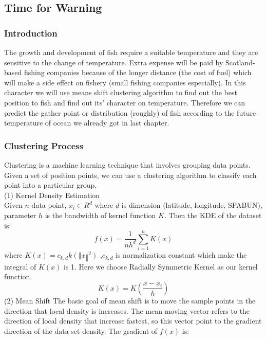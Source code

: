 \documentclass{mcmthesis}
\begin{document}
\subsection{Time for Warning}
\subsubsection{Introduction}
The growth and development of fish require a suitable temperature and they are sensitive to the change of temperature. Extra expense will be paid by Scotland-based fishing companies because of the longer distance (the cost of fuel) which will make a side effect on fishery (small fishing companies especially).  In this character we will use means shift clustering algorithm to find out the best position to fish and find out its’ character on temperature. Therefore we can predict the gather point or distribution (roughly) of fish according to the future temperature of ocean we already got in last chapter.
\subsubsection{Clustering Process}
Clustering is a machine learning technique that involves grouping data points. Given a set of position points, we can use a clustering algorithm to classify each point into a particular group. \\
(1) Kernel Density Estimation\\
Given $n$ data point, $x_{i}\in R^d$ where $d$ is dimension (latitude, longitude, SPABUN), parameter $h$ is the bandwidth of kernel function $K$. Then the KDE of the dataset is:
\begin{equation} f(x) = \frac{1}{nh^d}\sum_{i=1}^n K(x)\end{equation}
where $K(x)=c_{k,d} k(‖x‖^2)$ ,$ c_{k,d}$ is normalization constant which make the integral of $K(x)$ is 1. Here we choose Radially Symmetric Kernel as our kernel function.
\begin{equation} K(x)=K(\frac{x-x_{i}}{h})\end{equation}
(2) Mean Shift
The basic goal of mean shift is to move the sample points in the direction that  local density is increases. The mean moving vector refers to the direction of local density that increase fastest, so this vector point to the gradient direction of the data set density. The gradient of $f(x)$ is:
\end{document}
